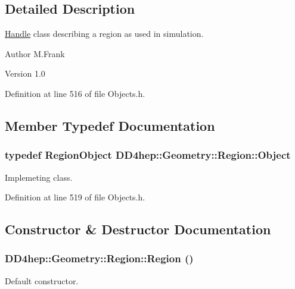 \subsection{Detailed Description}
\hyperlink{class_d_d4hep_1_1_handle}{Handle} class describing a region as used in simulation. \begin{DoxyAuthor}{Author}
M.Frank 
\end{DoxyAuthor}
\begin{DoxyVersion}{Version}
1.0 
\end{DoxyVersion}


Definition at line 516 of file Objects.h.

\subsection{Member Typedef Documentation}
\hypertarget{class_d_d4hep_1_1_geometry_1_1_region_ab66f17984d7dad2a865c8950b3604503}{
\subsubsection[{Object}]{\setlength{\rightskip}{0pt plus 5cm}typedef {\bf RegionObject} {\bf DD4hep::Geometry::Region::Object}}}
\label{class_d_d4hep_1_1_geometry_1_1_region_ab66f17984d7dad2a865c8950b3604503}


Implemeting class. 

Definition at line 519 of file Objects.h.

\subsection{Constructor \& Destructor Documentation}
\hypertarget{class_d_d4hep_1_1_geometry_1_1_region_ac8a2149581dcb28deb871bc812749cd7}{
\subsubsection[{Region}]{\setlength{\rightskip}{0pt plus 5cm}DD4hep::Geometry::Region::Region ()}}
\label{class_d_d4hep_1_1_geometry_1_1_region_ac8a2149581dcb28deb871bc812749cd7}


Default constructor. 

